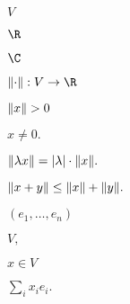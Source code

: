 \documentclass[10pt]{book}
\begin{document}
\begin{mdSnippets}
\begin{mdInlineSnippet}[5206560a306a2e085a437fd258eb57ce]%
$V$\end{mdInlineSnippet}%
\begin{mdInlineSnippet}%
$\R$\end{mdInlineSnippet}%
\begin{mdInlineSnippet}%
$\C$\end{mdInlineSnippet}%
\begin{mdInlineSnippet}[28ccc849fe12039a9b327310c799214a]%
$\norm{\cdot}: V \to \R$\end{mdInlineSnippet}%
\begin{mdInlineSnippet}%
$\norm{x} > 0$\end{mdInlineSnippet}%
\begin{mdInlineSnippet}[3198651f791aee4036bd038ad164424f]%
$x \ne 0.$\end{mdInlineSnippet}%
\begin{mdInlineSnippet}[76f750fb4d8531580b00d5141c3210d4]%
$\norm{\lambda x} = \left\vert \lambda\right\vert \cdot \norm{x}.$\end{mdInlineSnippet}%
\begin{mdInlineSnippet}%
$\norm{x + y} \le \norm{x} + \norm{y}.$\end{mdInlineSnippet}%
\begin{mdInlineSnippet}[902cf33a7f4382974cf79c09ea369a43]%
$(e_1, \dots, e_n)$\end{mdInlineSnippet}%
\begin{mdInlineSnippet}[a787dbc2f9902096a8fb13903dd63428]%
$V,$\end{mdInlineSnippet}%
\begin{mdInlineSnippet}[829765045ca7f6dcf958e9b3e8238a15]%
$x \in V$\end{mdInlineSnippet}%
\begin{mdInlineSnippet}%
$\sum_i x_i e_i.$\end{mdInlineSnippet}%
\begin{mdInlineSnippet}[00917ca72c7f74debc70f008746dd602]%

\end{mdInlineSnippet}
\end{mdSnippets}
\end{document}
